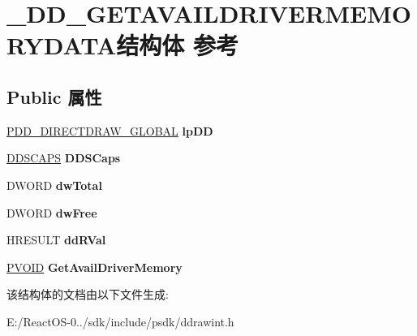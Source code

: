 \hypertarget{struct___d_d___g_e_t_a_v_a_i_l_d_r_i_v_e_r_m_e_m_o_r_y_d_a_t_a}{}\section{\+\_\+\+D\+D\+\_\+\+G\+E\+T\+A\+V\+A\+I\+L\+D\+R\+I\+V\+E\+R\+M\+E\+M\+O\+R\+Y\+D\+A\+T\+A结构体 参考}
\label{struct___d_d___g_e_t_a_v_a_i_l_d_r_i_v_e_r_m_e_m_o_r_y_d_a_t_a}
\subsection*{Public 属性}
\begin{DoxyCompactItemize}
\item 
\mbox{\label{struct___d_d___g_e_t_a_v_a_i_l_d_r_i_v_e_r_m_e_m_o_r_y_d_a_t_a_a0dc36f1c056d41e680cbfa9fa099aabb}} 
\hyperlink{struct___d_d___d_i_r_e_c_t_d_r_a_w___g_l_o_b_a_l}{P\+D\+D\+\_\+\+D\+I\+R\+E\+C\+T\+D\+R\+A\+W\+\_\+\+G\+L\+O\+B\+AL} {\bfseries lp\+DD}
\item 
\mbox{\label{struct___d_d___g_e_t_a_v_a_i_l_d_r_i_v_e_r_m_e_m_o_r_y_d_a_t_a_ac94733b2abe4cb87b9fb5706fc645e8b}} 
\hyperlink{struct___d_d_s_c_a_p_s}{D\+D\+S\+C\+A\+PS} {\bfseries D\+D\+S\+Caps}
\item 
\mbox{\label{struct___d_d___g_e_t_a_v_a_i_l_d_r_i_v_e_r_m_e_m_o_r_y_d_a_t_a_a7d2436025632de51d3434966f8e699de}} 
D\+W\+O\+RD {\bfseries dw\+Total}
\item 
\mbox{\label{struct___d_d___g_e_t_a_v_a_i_l_d_r_i_v_e_r_m_e_m_o_r_y_d_a_t_a_ab958ee7551d71de55977f61b83f75ed4}} 
D\+W\+O\+RD {\bfseries dw\+Free}
\item 
\mbox{\label{struct___d_d___g_e_t_a_v_a_i_l_d_r_i_v_e_r_m_e_m_o_r_y_d_a_t_a_ab1a98fed5e13e5eb6ad087ac3a83f3fc}} 
H\+R\+E\+S\+U\+LT {\bfseries dd\+R\+Val}
\item 
\mbox{\label{struct___d_d___g_e_t_a_v_a_i_l_d_r_i_v_e_r_m_e_m_o_r_y_d_a_t_a_a1aa82fa468e57f2d2e6897ee756da7c6}} 
\hyperlink{interfacevoid}{P\+V\+O\+ID} {\bfseries Get\+Avail\+Driver\+Memory}
\end{DoxyCompactItemize}


该结构体的文档由以下文件生成\+:\begin{DoxyCompactItemize}
\item 
E\+:/\+React\+O\+S-\/0../sdk/include/psdk/ddrawint.\+h\end{DoxyCompactItemize}
